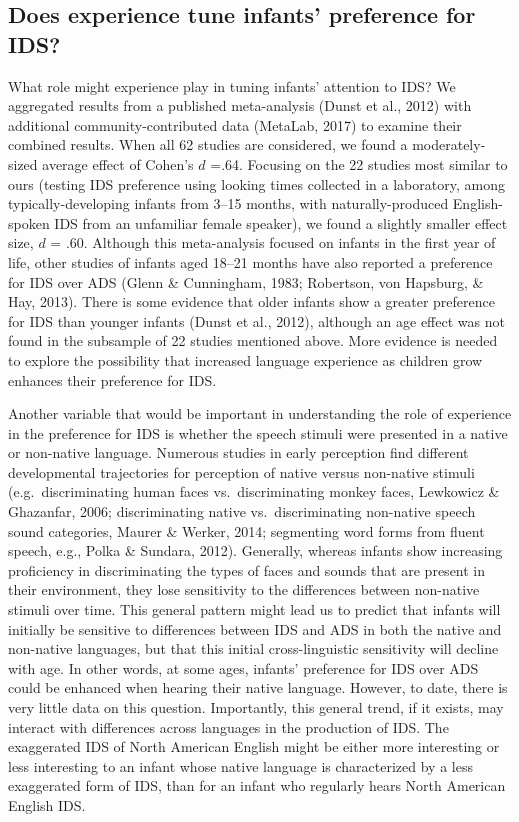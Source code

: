 \documentclass[
  english,
  ,man,floatsintext]{apa6}
\begin{document}
\hypertarget{does-experience-tune-infants-preference-for-ids}{%
\subsection{Does experience tune infants' preference for IDS?}\label{does-experience-tune-infants-preference-for-ids}}

What role might experience play in tuning infants' attention to IDS? We aggregated results from a published meta-analysis (Dunst et al., 2012) with additional community-contributed data (MetaLab, 2017) to examine their combined results. When all 62 studies are considered, we found a moderately-sized average effect of Cohen's \(d\) =.64. Focusing on the 22 studies most similar to ours (testing IDS preference using looking times collected in a laboratory, among typically-developing infants from 3--15 months, with naturally-produced English-spoken IDS from an unfamiliar female speaker), we found a slightly smaller effect size, \(d\) = .60. Although this meta-analysis focused on infants in the first year of life, other studies of infants aged 18--21 months have also reported a preference for IDS over ADS (Glenn \& Cunningham, 1983; Robertson, von Hapsburg, \& Hay, 2013). There is some evidence that older infants show a greater preference for IDS than younger infants (Dunst et al., 2012), although an age effect was not found in the subsample of 22 studies mentioned above. More evidence is needed to explore the possibility that increased language experience as children grow enhances their preference for IDS.

Another variable that would be important in understanding the role of experience in the preference for IDS is whether the speech stimuli were presented in a native or non-native language. Numerous studies in early perception find different developmental trajectories for perception of native versus non-native stimuli (e.g.~discriminating human faces vs.~discriminating monkey faces, Lewkowicz \& Ghazanfar, 2006; discriminating native vs.~discriminating non-native speech sound categories, Maurer \& Werker, 2014; segmenting word forms from fluent speech, e.g., Polka \& Sundara, 2012). Generally, whereas infants show increasing proficiency in discriminating the types of faces and sounds that are present in their environment, they lose sensitivity to the differences between non-native stimuli over time. This general pattern might lead us to predict that infants will initially be sensitive to differences between IDS and ADS in both the native and non-native languages, but that this initial cross-linguistic sensitivity will decline with age. In other words, at some ages, infants' preference for IDS over ADS could be enhanced when hearing their native language. However, to date, there is very little data on this question. Importantly, this general trend, if it exists, may interact with differences across languages in the production of IDS. The exaggerated IDS of North American English might be either more interesting or less interesting to an infant whose native language is characterized by a less exaggerated form of IDS, than for an infant who regularly hears North American English IDS.
\end{document}
